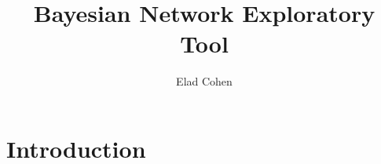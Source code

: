 \documentclass{article}
\title{Bayesian Network Exploratory Tool}
\author{Elad Cohen}
\newcommand{\comment}[2]{
	\todo[color=GreenYellow,inline]{
		\underline{\textbf{#1:}} #2
	}}
\begin{document}
\maketitle
            
            
            
            
            
            
            
            
            
    \section{Introduction}\label{sec:intro}
 
\end{document}
